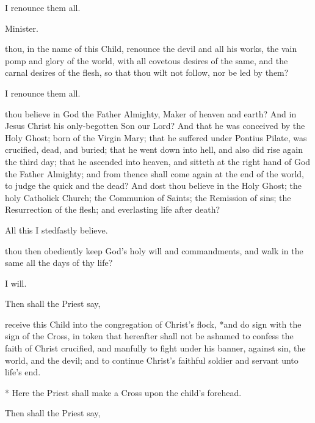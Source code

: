  I renounce them all.

\begin{center}
Minister.
\end{center}

 thou, in the name of this Child, renounce the devil and all his works, the vain pomp and glory of the world, with all covetous desires of the same, and the carnal desires of the flesh, so that thou wilt not follow, nor be led by them?

 I renounce them all.

 thou believe in God the Father Almighty, Maker of heaven and earth?
And in Jesus Christ his only-begotten Son our Lord?
And that he was conceived by the Holy Ghost; born of the Virgin Mary; that he suffered under Pontius Pilate, was crucified, dead, and buried; that he went down into hell, and also did rise again the third day; that he ascended into heaven, and sitteth at the right hand of God the Father Almighty; and from thence shall come again at the end of the world, to judge the quick and the dead?
And dost thou believe in the Holy Ghost; the holy Catholick Church; the Communion of Saints; the Remission of sins; the Resurrection of the flesh; and everlasting life after death?

 All this I stedfastly believe.

 thou then obediently keep God's holy will and commandments, and walk in the same all the days of thy life?

 I will.

\begin{rubric}
Then shall the Priest say,
\end{rubric}

 receive this Child into the congregation of Christ's flock, *and do sign  with the sign of the Cross, in token that hereafter  shall not be ashamed to confess the faith of Christ crucified, and manfully to fight under his banner, against sin, the world, and the devil; and to continue Christ's faithful soldier and servant unto  life's end.
\begin{secrubric}
* Here the Priest shall make a Cross upon the child's forehead.
\end{secrubric}

\begin{rubric}
Then shall the Priest say,
\end{rubric}

